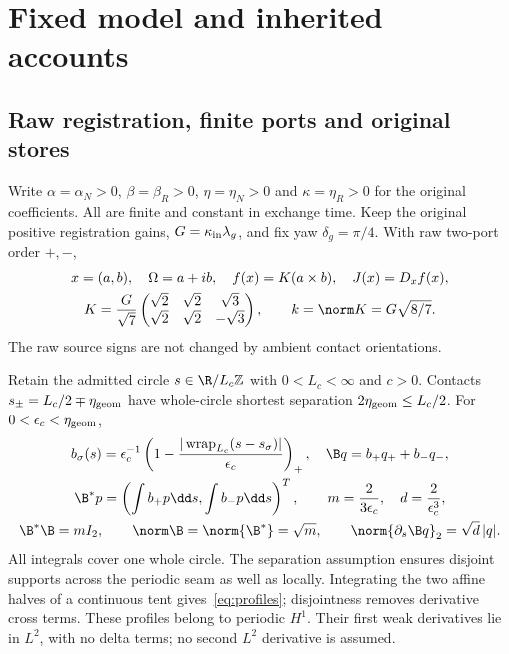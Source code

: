 \section{Fixed model and inherited accounts}\label{sec:model}
\subsection{Raw registration, finite ports and original stores}
Write $\alpha=\alpha_N>0$, $\beta=\beta_R>0$, $\eta=\eta_N>0$ and $\kappa=\eta_R>0$ for the original coefficients. All are finite and constant in exchange time. Keep the original positive registration gains, $G=\kappa_{\rm in}\lambda_g$, and fix yaw $\delta_g=\pi/4$. With raw two-port order $+,-$,
\begin{equation}\label{eq:registration}%
\begin{gathered}
 x=(a,b),\quad \Omega=a+ib,\quad f(x)=K(a\times b),\quad J(x)=D_xf(x),\\
 K=\frac G{\sqrt7}
 \begin{pmatrix}\sqrt2&\sqrt2&\sqrt3\\
                 \sqrt2&\sqrt2&-\sqrt3\end{pmatrix},
 \qquad k=\norm K=G\sqrt{8/7}.
\end{gathered}
\end{equation}
The raw source signs are not changed by ambient contact orientations.

Retain the admitted circle $s\in\R/L_c\mathbb Z$ with $0<L_c<\infty$ and $c>0$. Contacts $s_\pm=L_c/2\mp\eta_{\rm geom}$ have whole-circle shortest separation $2\eta_{\rm geom}\le L_c/2$. For $0<\epsilon_c<\eta_{\rm geom}$,
\begin{equation}\label{eq:profiles}%
\begin{gathered}
 b_\sigma(s)=\epsilon_c^{-1}
 \left(1-\frac{|\operatorname{wrap}_{L_c}(s-s_\sigma)|}{\epsilon_c}\right)_+,
 \quad \B q=b_+q_++b_-q_-,\\
 \B^*p=\left(\int b_+p\dd s,\int b_-p\dd s\right)^T,\qquad
 m=\frac2{3\epsilon_c},\quad d=\frac2{\epsilon_c^3},\\
 \B^*\B=mI_2,\qquad \norm\B=\norm{\B^*}=\sqrt m,\qquad
 \norm{\partial_s\B q}_2=\sqrt d\,|q|.
\end{gathered}
\end{equation}
All integrals cover one whole circle. The separation assumption ensures disjoint supports across the periodic seam as well as locally. Integrating the two affine halves of a continuous tent gives~\eqref{eq:profiles}; disjointness removes derivative cross terms. These profiles belong to periodic $H^1$. Their first weak derivatives lie in $L^2$, with no delta terms; no second $L^2$ derivative is assumed.

